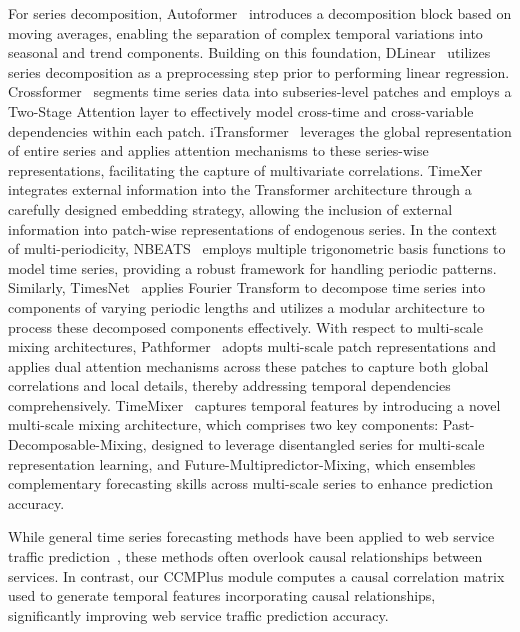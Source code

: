 For series decomposition, Autoformer~\cite{wu2021autoformer} introduces a decomposition block based on moving averages, enabling the separation of complex temporal variations into seasonal and trend components. Building on this foundation, DLinear~\cite{zeng2023transformers} utilizes series decomposition as a preprocessing step prior to performing linear regression. Crossformer~\cite{zhang2023crossformer} segments time series data into subseries-level patches and employs a Two-Stage Attention layer to effectively model cross-time and cross-variable dependencies within each patch. iTransformer~\cite{liuitransformer} leverages the global representation of entire series and applies attention mechanisms to these series-wise representations, facilitating the capture of multivariate correlations. TimeXer~\cite{wang2024timexer} integrates external information into the Transformer architecture through a carefully designed embedding strategy, allowing the inclusion of external information into patch-wise representations of endogenous series. In the context of multi-periodicity, NBEATS~\cite{oreshkinn} employs multiple trigonometric basis functions to model time series, providing a robust framework for handling periodic patterns. Similarly, TimesNet~\cite{wutimesnet} applies Fourier Transform to decompose time series into components of varying periodic lengths and utilizes a modular architecture to process these decomposed components effectively. With respect to multi-scale mixing architectures, Pathformer~\cite{chenpathformer} adopts multi-scale patch representations and applies dual attention mechanisms across these patches to capture both global correlations and local details, thereby addressing temporal dependencies comprehensively. TimeMixer~\cite{wangtimemixer} captures temporal features by introducing a novel multi-scale mixing architecture, which comprises two key components: Past-Decomposable-Mixing, designed to leverage disentangled series for multi-scale representation learning, and Future-Multipredictor-Mixing, which ensembles complementary forecasting skills across multi-scale series to enhance prediction accuracy.

While general time series forecasting methods have been applied to web service traffic prediction~\cite{pan2023magicscaler, zou2024optscaler,catillo2023survey}, these methods often overlook causal relationships between services. In contrast, our CCMPlus module computes a causal correlation matrix used to generate temporal features incorporating causal relationships, significantly improving web service traffic prediction accuracy.



